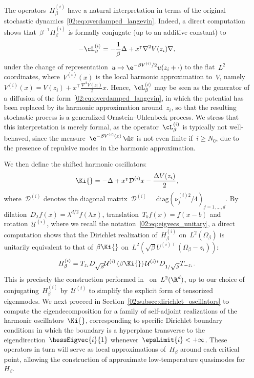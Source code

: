     \begin{remark}
    The operators~$H_\beta^{(i)}$ have a natural interpretation in terms of the original stochastic dynamics~\eqref{02:eq:overdamped_langevin}. Indeed, a direct computation shows that~$\beta^{-1}H_\beta^{(i)}$ is formally conjugate (up to an additive constant) to
    \begin{equation}
        \label{02:eq:generator_ou}
        -\cL_\beta^{(i)} = - \frac1\beta\Delta+x^\intercal\nabla^2 V(z_i) \nabla ,
    \end{equation}
    under the change of representation~$u\mapsto \e^{-\beta V^{(i)}/2}u(z_i+\cdot)$ to the flat~$L^2$ coordinates, where~${V^{(i)}(x)}$ is the local harmonic approximation to~$V$, namely $V^{(i)}(x)={V(z_i) + x^\intercal \frac{\nabla^2 V(z_i)}2 x}$. 
    Hence,~$\cL_\beta^{(i)}$ may be seen as the generator of a diffusion of the form~\eqref{02:eq:overdamped_langevin}, in which the potential has been replaced by its harmonic approximation around~$z_i$, so that the resulting stochastic process is a generalized Ornstein--Uhlenbeck process. We stress that this interpretation is merely formal, as the operator~$\cL_\beta^{(i)}$ is typically not well-behaved, since the measure~$\e^{-\beta V^{(i)}(x)}\,\d x$ is not even finite if~$i\geq N_0$, due to the presence of repulsive modes in the harmonic approximation.
    \end{remark}
    We then define the shifted harmonic oscillators:
    \begin{equation}
        \label{02:eq:rescaled_oscillator}
        \Ki{} = -\Delta  + x^\intercal \mathcal D^{(i)} x -\frac{\Delta V(z_i)}2,\end{equation}
    where~$\mathcal D^{(i)}$ denotes the diagonal matrix~$\mathcal D^{(i)}=\mathrm{diag}\left(\nu_j^{(i)2}/4\right)_{j=1,\dots,d}$.
    By dilation~$D_\lambda f(x) = \lambda^{d/2}f(\lambda x)$, translation~$T_b f(x) = f(x-b)$ and rotation~$\mathcal U^{(i)}$, where we recall the notation~\eqref{02:eq:eigvecs_unitary}, a direct computation shows that
    the Dirichlet realization of~$H_{\beta}^{(i)}$ on~$L^2(\Omega_\beta)$ is unitarily equivalent to that of~$\beta \Ki{}$ on~$L^2(\sqrt{\beta}U^{(i)\intercal}(\Omega_\beta-z_i))$:
    \begin{equation}
        \label{02:eq:harmonic_conjugation}
        H_{\beta}^{(i)} = T_{z_i}D_{\sqrt\beta}\mathcal U^{(i)}\left(\beta \Ki{}\right)\mathcal U^{(i)*}D_{1/\sqrt\beta}T_{-z_i}.
    \end{equation}
    This is precisely the construction performed in~\cite{CFKS87} on~$L^2(\R^d)$, up to our choice of conjugating~$H_\beta^{(i)}$ by~$\mathcal U^{(i)}$ to simplify the explicit form of tensorized eigenmodes.
    We next proceed in Section~\ref{02:subsec:dirichlet_oscillators} to compute the eigendecomposition for a family of self-adjoint realizations of the harmonic oscillators~$\Ki{}$, corresponding to specific Dirichlet boundary conditions in which the boundary is a hyperplane transverse to the eigendirection~$\hessEigvec{i}{1}$ whenever~$\epsLimit{i}<+\infty$. These operators in turn will serve as local approximations of~$H_\beta$ around each critical point, allowing the construction of approximate low-temperature quasimodes for~$H_\beta$.

